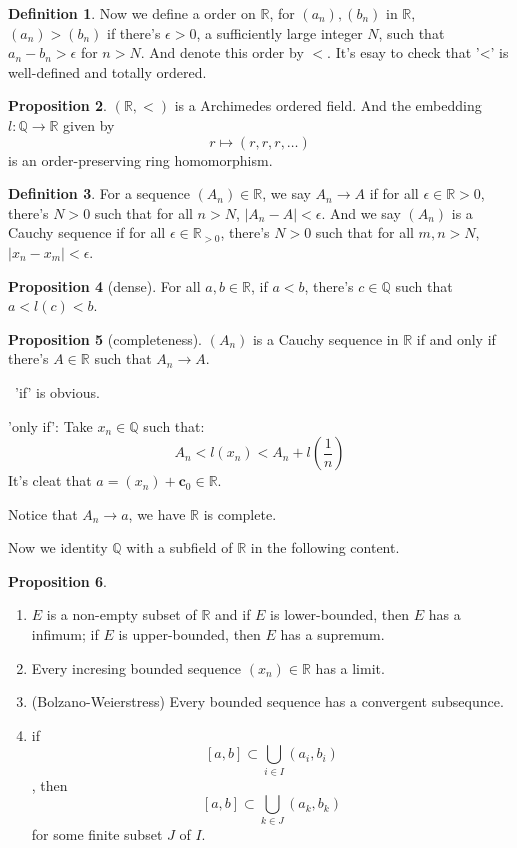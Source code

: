 \documentclass[12pt,a4paper]{book}
\newenvironment{prooff}{{\noindent\it\textcolor{cyan!40!black}{Proof}:}\,}{\par}
\newcommand{\bb}[1]{\mathbb{#1}}
\newenvironment{enu}{\begin{enumerate}[(1)]}{\end{enumerate}}
\theoremstyle{definition}
\newtheorem{defn}{Definition}[section]
\newtheorem{prop}[defn]{Proposition}
\begin{document}
\begin{defn}
    Now we define a order on $\bb{R}$, for $(a_n),(b_n)$ in $\bb{R}$, $(a_n)>(b_n)$ if  there's $\epsilon>0$, a sufficiently large integer $N$, such that $a_n-b_n>\epsilon$ for $n>N$. And denote this order by $<$. It's esay to check that '<' is well-defined and
    totally ordered.
\end{defn}
\begin{prop}
    $(\bb{R},<)$ is a Archimedes ordered field. And the embedding $l:\bb{Q}\rightarrow \bb{R}$ given by
    \begin{equation*}
        r\mapsto (r,r,r,\dots)
    \end{equation*}
    is an order-preserving ring homomorphism.
\end{prop}
\begin{defn}
    For a sequence $(A_n)\in \bb{R}$, we say $A_n\rightarrow A$ if for all $\epsilon\in\bb{R}>0$, there's $N>0$ such that for all $n>N$, $|A_n-A|<\epsilon$. And we say $(A_n)$ is a Cauchy sequence if for all $\epsilon \in \bb{R}_{>0}$, there's $N>0$ such that for all $m,n>N$, $|x_n-x_m|<\epsilon$.
\end{defn}
\begin{prop}[dense]
    For all $a,b\in \bb{R}$, if $a<b$, there's $c\in \bb{Q}$ such that $a<l(c)<b$.
\end{prop}
\begin{prop}[completeness]
    $(A_n)$ is a Cauchy sequence in $\bb{R}$ if and only if there's $A\in \bb{R}$ such that $A_n\rightarrow A$.
\end{prop}
\begin{prooff}
    'if' is obvious.

    'only if': Take $x_n\in \mathbb{Q}$ such that:
    $$
        A_n<l(x_n)<A_n+l(\frac{1}{n})
    $$
    It's cleat that $a=(x_n)+\mathbf{c}_0\in \mathbb{R}$.

    Notice that $A_n\rightarrow a$, we have $\bb{R}$ is complete.
\end{prooff}

\vskip 1cm
Now we identity $\bb{Q}$ with a subfield of $\bb{R}$ in the following content.

\begin{prop}
    \begin{enu}
        \item $E$ is a non-empty subset of $\bb{R}$ and if $E$ is lower-bounded, then $E$ has a infimum; if $E$ is upper-bounded, then $E$ has a supremum.
        \item Every incresing bounded sequence $(x_n)\in \bb{R}$ has a limit.
        \item (Bolzano-Weierstress) Every bounded sequence has a convergent subsequnce.
        \item if $$[a,b]\subset \bigcup_{i\in I}(a_i,b_i)$$, then $$[a,b]\subset \bigcup_{k\in J}(a_k,b_k)$$ for some finite subset $J$ of $I$.
    \end{enu}
\end{prop}
\end{document}

